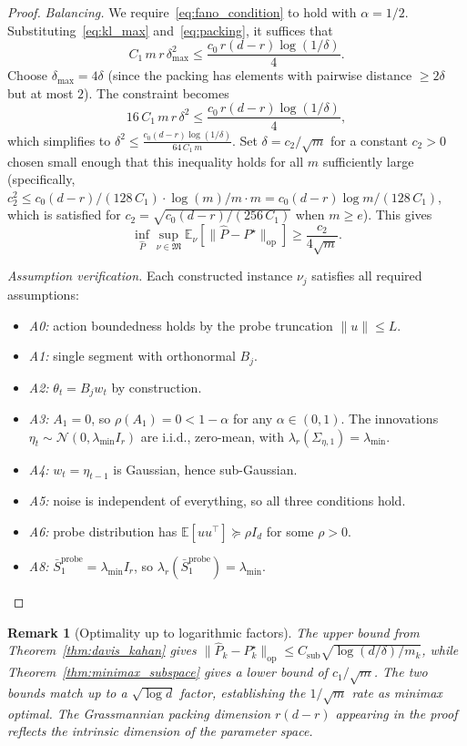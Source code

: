 \documentclass[12pt]{article}
\newcommand{\E}{\mathbb{E}}
\newcommand{\op}{\mathrm{op}}
\newtheorem{remark}{Remark}
\theoremstyle{plain}
\theoremstyle{definition}
\begin{document}
\begin{proof}
\emph{Balancing.}
We require~\eqref{eq:fano_condition} to hold with $\alpha = 1/2$. Substituting~\eqref{eq:kl_max} and~\eqref{eq:packing}, it suffices that
\[
C_1\, m\, r\, \delta_{\max}^2 \le \frac{c_0\, r(d - r) \log(1/\delta)}{4}.
\]
Choose $\delta_{\max} = 4\delta$ (since the packing has elements with pairwise distance $\ge 2\delta$ but at most $2$). The constraint becomes
\[
16\, C_1\, m\, r\, \delta^2 \le \frac{c_0\, r(d - r) \log(1/\delta)}{4},
\]
which simplifies to $\delta^2 \le \frac{c_0(d-r)\log(1/\delta)}{64\, C_1\, m}$.
Set $\delta = c_2 / \sqrt{m}$ for a constant $c_2 > 0$ chosen small enough that this inequality holds for all $m$ sufficiently large (specifically, $c_2^2 \le c_0(d-r) / (128\, C_1) \cdot \log(m) / m \cdot m = c_0(d-r)\log m / (128\, C_1)$, which is satisfied for $c_2 = \sqrt{c_0(d-r)/(256\, C_1)}$ when $m \ge e$). This gives
\[
\inf_{\widehat{P}} \sup_{\nu \in \mathfrak{M}} \E_\nu[\|\widehat{P} - P^\star\|_{\op}]
\ge \frac{c_2}{4\sqrt{m}}.
\]

\emph{Assumption verification.}
Each constructed instance $\nu_j$ satisfies all required assumptions:
\begin{itemize}[nosep]
\item \emph{A0:} action boundedness holds by the probe truncation $\|u\| \le L$.
\item \emph{A1:} single segment with orthonormal $B_j$.
\item \emph{A2:} $\theta_t = B_j w_t$ by construction.
\item \emph{A3:} $A_1 = 0$, so $\rho(A_1) = 0 < 1 - \alpha$ for any $\alpha \in (0, 1)$.
The innovations $\eta_t \sim \mathcal{N}(0, \lambda_{\min} I_r)$ are i.i.d., zero-mean, with $\lambda_r(\Sigma_{\eta,1}) = \lambda_{\min}$.
\item \emph{A4:} $w_t = \eta_{t-1}$ is Gaussian, hence sub-Gaussian.
\item \emph{A5:} noise is independent of everything, so all three conditions hold.
\item \emph{A6:} probe distribution has $\E[uu^\top] \succeq \rho I_d$ for some $\rho > 0$.
\item \emph{A8:} $\bar{S}_1^{\mathrm{probe}} = \lambda_{\min} I_r$, so $\lambda_r(\bar{S}_1^{\mathrm{probe}}) = \lambda_{\min}$. \qedhere
\end{itemize}
\end{proof}

\begin{remark}[Optimality up to logarithmic factors]
The upper bound from Theorem~\ref{thm:davis_kahan} gives $\|\widehat{P}_k - P_k^\star\|_{\op} \le C_{\mathrm{sub}}\sqrt{\log(d/\delta)/m_k}$, while Theorem~\ref{thm:minimax_subspace} gives a lower bound of $c_1/\sqrt{m}$. The two bounds match up to a $\sqrt{\log d}$ factor, establishing the $1/\sqrt{m}$ rate as minimax optimal. The Grassmannian packing dimension $r(d-r)$ appearing in the proof reflects the intrinsic dimension of the parameter space.
\end{remark}
\end{document}
